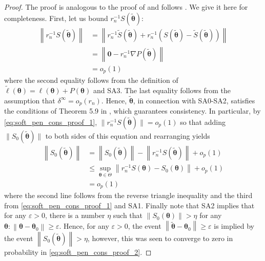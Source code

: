 \documentclass[11pt, a4paper]{article}
\newcommand*{\bb}{\boldsymbol}
\newcommand{\vnorm}[1]{\ensuremath{{\left\| #1 \right\|}}}
\theoremstyle{example} \newtheorem{example}{Example}[section]
\theoremstyle{theorem} \newtheorem{theorem}{Theorem}[section]
\theoremstyle{theorem }\newtheorem{proposition}{Proposition}[section]
\theoremstyle{theorem }\newtheorem{corollary}{Corollary}[section]
\def\\bbeta{\bb{\\bbeta}}
\def\btheta{\bb{\theta}}
\def\b0{\bb{0}}
\def\btnod{\bb{\theta}_0}
\def\bttilde{\tilde{\bb{\theta}}}
\begin{document}
	\begin{proof}
		The proof is analogous to the proof of \citet[Theorem 1]{ogden:2017} and follows \citet[Theorem 5.9]{vaart:1998}. We give it here for completeness. First, let us bound $r_n^{-1}S(\bttilde)$: 
		\begin{equation}
		\label{eq:soft_pen_cons_proof_1}
		\begin{aligned}
		\vnorm{ r_n^{-1}S(\bttilde) } & = \vnorm{ r_n^{-1}\tilde{S}(\bttilde) + r_n^{-1}(S(\bttilde)-\tilde{S}(\bttilde)) } \\
		&= \vnorm{ \b0 -r_n^{-1}\nabla P(\bttilde) } \\
		&= o_p(1)
		\end{aligned}
		\end{equation}
		where the second equality follows from the definition of $\tilde{\ell}(\btheta) = \ell(\btheta) + P(\btheta)$ and SA3. The last equality follows from the assumption that $\delta^\infty = o_p(r_n)$. Hence, $\bttilde$, in connection with SA0-SA2, satisfies the conditions of Theorem 5.9 in \cite{vaart:1998}, which guarantees consistency. In particular, by \eqref{eq:soft_pen_cons_proof_1}, $\| r_n^{-1}{S}(\bttilde) \| =   o_p(1)$ so that adding $\| S_0(\bttilde)\|$ to both sides of this equation and rearranging yields 
		\begin{equation}
		\label{eq:soft_pen_cons_proof_2}
		\begin{aligned}
		\vnorm{S_0(\bttilde)}&=   \vnorm{S_0(\bttilde)}-\vnorm{r_n^{-1}{S}(\bttilde)} + o_p(1) \\ 
		&\leq \underset{\btheta \in \Theta}{\sup} \vnorm{r_n^{-1}{S}(\btheta)-S_0(\btheta) } + o_p(1)  \\ 
		&= o_p(1)	
		\end{aligned}
		\end{equation}
		where the second line follows from the reverse triangle inequality and the  third from \eqref{eq:soft_pen_cons_proof_1} and SA1. Finally note that SA2 implies that for any $\varepsilon>0$, there is a number $\eta$ such that $\vnorm{S_0(\btheta)}>\eta$ for any $\btheta: \vnorm{\btheta-\btnod} \geq \varepsilon$. Hence, for any $\varepsilon>0$, the event $\vnorm{\bttilde-\btnod}\geq \varepsilon$ is implied by the event $\vnorm{S_0(\bttilde)}>\eta$, however, this was seen to converge to zero in probability in \eqref{eq:soft_pen_cons_proof_2}.
	\end{proof}
	
\end{document}
